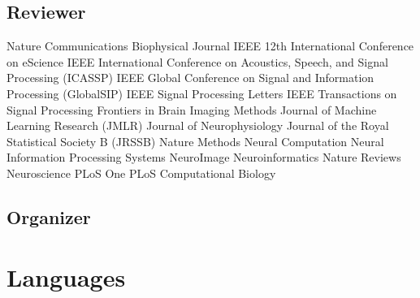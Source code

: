 \documentclass[10pt,colorlinks=true,urlcolor=blue]{moderncv}
\begin{document}
\subsection{Reviewer}
\cventry {} {Nature Communications} {}{}{}{}
\cventry {} {Biophysical Journal} {}{}{}{}
\cventry {} {IEEE 12th International Conference on eScience} {}{}{}{} 
\cventry {} {IEEE International Conference on Acoustics, Speech, and Signal Processing (ICASSP)} {}{}{}{}
\cventry {} {IEEE Global Conference on Signal and Information Processing (GlobalSIP)} {} {} {} {}
\cventry {} {IEEE Signal Processing Letters} {} {} {} {} 
\cventry {} {IEEE Transactions on Signal Processing} {}{}{}{}
\cventry {} {Frontiers in Brain Imaging Methods} {}{}{}{}
\cventry {} {Journal of Machine Learning Research (JMLR)} {}{}{}{}
\cventry {} {Journal of Neurophysiology} {}{}{}{}
\cventry {} {Journal of the Royal Statistical Society B (JRSSB)} {}{}{}{}
\cventry {} {Nature Methods} {}{}{}{}
\cventry {} {Neural Computation} {}{}{}{}
\cventry {} {Neural Information Processing Systems} {}{}{}{}
\cventry {} {NeuroImage} {}{}{}{}
\cventry {} {Neuroinformatics} {}{}{}{}
\cventry {} {Nature Reviews Neuroscience} {}{}{}{}
\cventry {} {PLoS One} {}{}{}{}
\cventry {} {PLoS Computational Biology} {}{}{}{}


\subsection{Organizer}




\section{Languages}
\end{document}
